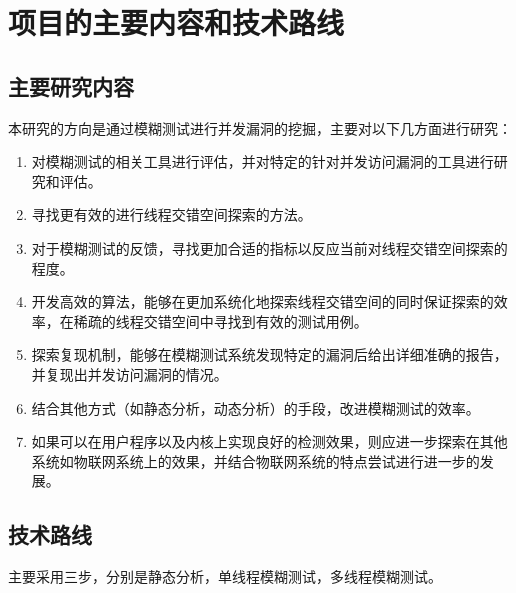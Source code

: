 \section{项目的主要内容和技术路线}

\subsection{主要研究内容}

本研究的方向是通过模糊测试进行并发漏洞的挖掘，主要对以下几方面进行研究：

\begin{enumerate}
\item 对模糊测试的相关工具进行评估，并对特定的针对并发访问漏洞的工具进行研究和评估。
\item 寻找更有效的进行线程交错空间探索的方法。
\item 对于模糊测试的反馈，寻找更加合适的指标以反应当前对线程交错空间探索的程度。
\item 开发高效的算法，能够在更加系统化地探索线程交错空间的同时保证探索的效率，在稀疏的线程交错空间中寻找到有效的测试用例。
\item 探索复现机制，能够在模糊测试系统发现特定的漏洞后给出详细准确的报告，并复现出并发访问漏洞的情况。
\item 结合其他方式（如静态分析，动态分析）的手段，改进模糊测试的效率。
\item 如果可以在用户程序以及内核上实现良好的检测效果，则应进一步探索在其他系统如物联网系统上的效果，并结合物联网系统的特点尝试进行进一步的发展。
\end{enumerate}

\subsection{技术路线}

主要采用三步，分别是静态分析，单线程模糊测试，多线程模糊测试。

